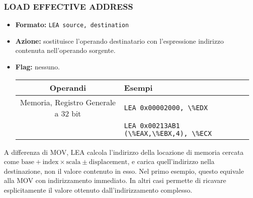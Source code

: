 \documentclass[a4paper,11pt]{article}
\begin{document}
\subsubsection{LOAD EFFECTIVE ADDRESS}
\begin{itemize}
	\item \textbf{Formato:} \lstinline|LEA source, destination|
	\item \textbf{Azione:} sostituisce l'operando destinatario con l'espressione indirizzo contenuta nell'operando sorgente.
	\item \textbf{Flag:} nessuno.

		\begin{table}[h!]
			\center {}
			\begin{tabular} { c | p{7cm} }
				\bfseries Operandi & \bfseries Esempi \\
				\hline 
				Memoria, Registro Generale a 32 bit & \lstinline|LEA 0x00002000, \%EDX| \\
																						& \lstinline|LEA 0x00213AB1 (\%EAX,\%EBX,4), \%ECX|
			\end{tabular}
		\end{table}
\end{itemize}

A differenza di MOV, LEA calcola l'indirizzo della locazione di memoria cercata come $ \text{base} + \text{index} \times \text{scala} \pm \text{displacement} $, e carica quell'indirizzo nella destinazione, non il valore contenuto in esso.
Nel primo esempio, questo equivale alla MOV con indirizzamento immediato.
In altri casi permette di ricavare esplicitamente il valore ottenuto dall'indirizzamento complesso.
\end{document}
